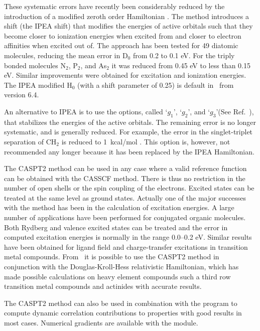 These systematic errors have recently been considerably reduced by the
introduction of a modified zeroth order Hamiltonian \cite{Ghigo:04a}. The method
introduces a shift (the IPEA shift) that modifies the energies of active
orbitals such that they become closer to ionization energies when excited from
and closer to electron affinities when excited out of. The approach has been
tested for 49 diatomic molecules, reducing the mean error in D$_0$ from 0.2 to
0.1 eV. For the triply bonded molecules N$_2$, P$_2$, and As$_2$ it was reduced
from 0.45 eV to less than 0.15 eV. Similar improvements were obtained for
excitation and ionization energies. The IPEA modified H$_0$ (with a shift
parameter of 0.25) is default in \molcas\ from version 6.4.

An alternative to IPEA is to use the options, called `$g_1$', `$g_2$', and
`$g_3$'(See Ref.~\cite{Andersson:95a}), that stabilizes the energies of the
active orbitals. The remaining error is no longer systematic, and is generally
reduced. For example, the error in  the singlet-triplet separation of CH$_2$ is
reduced to 1~kcal/mol \cite{Andersson:95a}. This option is, however, not
recommended any longer because it has been replaced by the IPEA Hamiltonian.

The CASPT2 method can be used in any case where a valid reference function can
be obtained with the CASSCF method. There is thus no restriction in the number
of open shells or the spin coupling of the electrons. Excited states can be
treated at the same level as ground states. Actually one of the major
successes with the method has been in the calculation of excitation energies.
A large number of applications have been performed for conjugated organic
molecules. Both Rydberg and valence excited states can be treated and the
error in computed excitation energies is normally in the range 0.0--0.2 eV.
Similar results have been obtained for ligand field and charge-transfer
excitations in transition metal compounds. From \molcasvi\ it is possible to use
the CASPT2 method in conjunction with the Douglas-Kroll-Hess relativistic
Hamiltonian, which has made possible calculations on heavy element compounds
such a third row transition metal compounds and actinides with accurate results.

The CASPT2 method can also be used in combination with the 
program to compute dynamic correlation contributions to properties with good
results in most cases.  Numerical gradients are available with the
 module.

